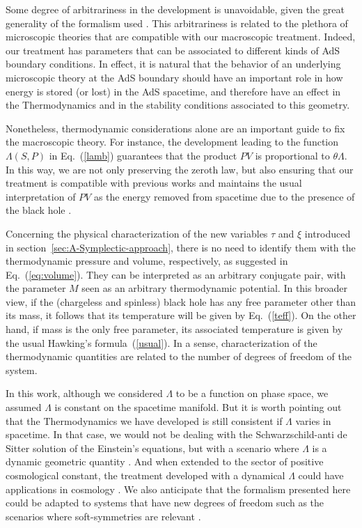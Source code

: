 \documentclass[prd,onecolumn,notitlepage,amsmath,nofootinbib,superscriptaddress,showpacs,showkeys]{revtex4-1}
\begin{document}
Some degree of arbitrariness in the development is unavoidable, given
the great generality of the formalism used \cite{baldfresmol2016}.
This arbitrariness is related to the plethora of microscopic theories
that are compatible with our macroscopic treatment. Indeed, our treatment
has parameters that can be associated to different kinds of AdS boundary
conditions. In effect, it is natural that the behavior of an underlying
microscopic theory at the AdS boundary should have an important role
in how energy is stored (or lost) in the AdS spacetime, and therefore
have an effect in the Thermodynamics and in the stability conditions
associated to this geometry.

Nonetheless, thermodynamic considerations alone are an important guide
to fix the macroscopic theory. For instance, 
the development leading to the function $\Lambda(S,P)$ in Eq.~(\ref{lamb})
guarantees that the product $PV$ is proportional to $\theta \Lambda$. In this way, we are not only preserving the zeroth law, but also ensuring that our treatment is compatible with previous works and maintains the usual interpretation of $PV$ as the energy removed from spacetime due to the presence of the black hole \cite{Joh14}.


Concerning the physical characterization of the new variables $\tau$ 
and $\xi$ introduced in section~\ref{sec:A-Symplectic-approach}, 
there is no need to identify them with the thermodynamic pressure and 
volume, respectively, as suggested in Eq.~(\ref{eq:volume}). 
They can be interpreted as an arbitrary conjugate pair, with the parameter $M$ 
seen as an arbitrary thermodynamic potential. 
In this broader view, if the (chargeless and spinless) black hole has any free parameter other than its mass, it follows that its temperature will be given by Eq.~(\ref{teff}). On the other hand, if mass is the only free parameter, its associated temperature is given by the usual Hawking's formula~(\ref{usual}). 
In a sense, characterization of the thermodynamic quantities are related to the number of degrees of freedom of the system.

In this work, although we considered $\Lambda$ to be a function on
phase space, we assumed $\Lambda$ is constant on the spacetime manifold.
But it is worth pointing out that the Thermodynamics
we have developed is still consistent if $\Lambda$ varies in spacetime.
In that case, we would not be dealing with the Schwarzschild-anti
de Sitter solution of the Einstein's equations, but with a scenario
where $\Lambda$ is a dynamic geometric quantity \cite{kastor2009}.
And when extended to the sector of positive cosmological constant,
the treatment developed with a dynamical $\Lambda$ could have applications
in cosmology \cite{Lima}. We also anticipate that the formalism
presented here could be adapted to systems that have new degrees of
freedom such as the scenarios where soft-symmetries are relevant \cite{Haw2016}.
\end{document}

